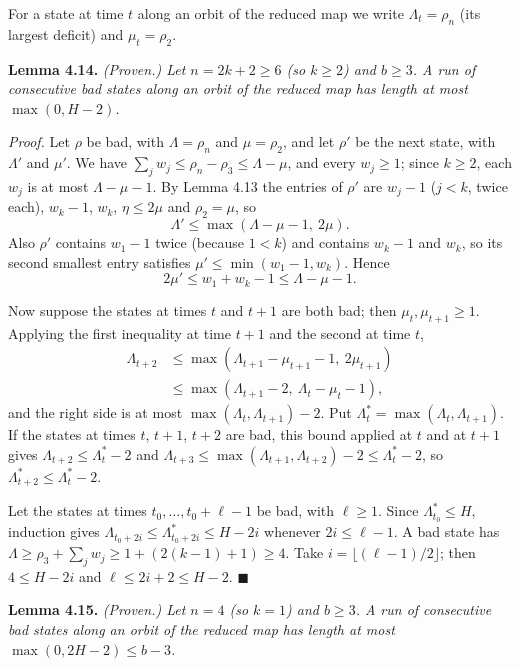 \documentclass[11pt,letterpaper]{article}
\theoremstyle{paperstyle}
\theoremstyle{paperstyledef}
\theoremstyle{paperstylerem}
\begin{document}
For a state at time \(t\) along an orbit of the reduced map we write \(\Lambda_t = \rho_n\) (its largest deficit) and \(\mu_t = \rho_2\).

\textbf{Lemma 4.14.} \emph{(Proven.) Let \(n = 2k+2 \geq 6\) (so \(k \geq 2\)) and \(b \geq 3\). A run of consecutive bad states along an orbit of the reduced map has length at most \(\max(0, H - 2)\).}

\emph{Proof.} Let \(\rho\) be bad, with \(\Lambda = \rho_n\) and \(\mu = \rho_2\), and let \(\rho'\) be the next state, with \(\Lambda'\) and \(\mu'\). We have \(\sum_j w_j \leq \rho_n - \rho_3 \leq \Lambda - \mu\), and every \(w_j \geq 1\); since \(k \geq 2\), each \(w_j\) is at most \(\Lambda - \mu - 1\). By Lemma 4.13 the entries of \(\rho'\) are \(w_j - 1\) (\(j < k\), twice each), \(w_k - 1\), \(w_k\), \(\eta \leq 2\mu\) and \(\rho_2 = \mu\), so \[\Lambda' \leq \max(\Lambda - \mu - 1,\ 2\mu).\] Also \(\rho'\) contains \(w_1 - 1\) twice (because \(1 < k\)) and contains \(w_k - 1\) and \(w_k\), so its second smallest entry satisfies \(\mu' \leq \min(w_1 - 1, w_k)\). Hence \[2\mu' \leq w_1 + w_k - 1 \leq \Lambda - \mu - 1.\]

Now suppose the states at times \(t\) and \(t+1\) are both bad; then \(\mu_t, \mu_{t+1} \geq 1\). Applying the first inequality at time \(t+1\) and the second at time \(t\), \[\begin{aligned}\Lambda_{t+2} & \leq \max(\Lambda_{t+1} - \mu_{t+1} - 1,\ 2\mu_{t+1}) \\ & \leq \max(\Lambda_{t+1} - 2,\ \Lambda_t - \mu_t - 1),\end{aligned}\] and the right side is at most \(\max(\Lambda_t, \Lambda_{t+1}) - 2\). Put \(\Lambda^*_t = \max(\Lambda_t, \Lambda_{t+1})\). If the states at times \(t\), \(t+1\), \(t+2\) are bad, this bound applied at \(t\) and at \(t+1\) gives \(\Lambda_{t+2} \leq \Lambda^*_t - 2\) and \(\Lambda_{t+3} \leq \max(\Lambda_{t+1}, \Lambda_{t+2}) - 2 \leq \Lambda^*_t - 2\), so \(\Lambda^*_{t+2} \leq \Lambda^*_t - 2\).

Let the states at times \(t_0, \dots, t_0 + \ell - 1\) be bad, with \(\ell \geq 1\). Since \(\Lambda^*_{t_0} \leq H\), induction gives \(\Lambda_{t_0 + 2i} \leq \Lambda^*_{t_0 + 2i} \leq H - 2i\) whenever \(2i \leq \ell - 1\). A bad state has \(\Lambda \geq \rho_3 + \sum_j w_j \geq 1 + (2(k-1) + 1) \geq 4\). Take \(i = \lfloor (\ell-1)/2 \rfloor\); then \(4 \leq H - 2i\) and \(\ell \leq 2i + 2 \leq H - 2\). \(\blacksquare\)

\textbf{Lemma 4.15.} \emph{(Proven.) Let \(n = 4\) (so \(k = 1\)) and \(b \geq 3\). A run of consecutive bad states along an orbit of the reduced map has length at most \(\max(0, 2H - 2) \leq b - 3\).}
\end{document}
